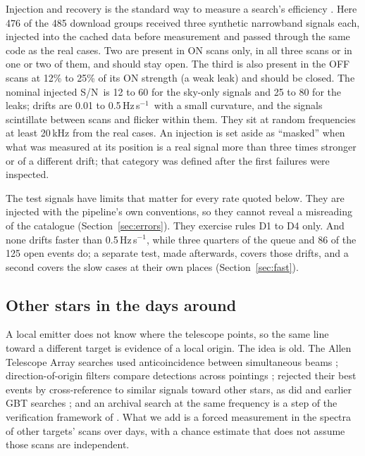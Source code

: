 \documentclass[twocolumn]{aastex631}
\newcommand{\hzs}{Hz\,s$^{-1}$}
\newcommand{\sn}{S/N}
\begin{document}
Injection and recovery is the standard way to measure a search's efficiency
\citep{Margot2021,Brzycki2022}. Here 476 of the 485 download groups
received three synthetic narrowband signals each, injected into the cached
data before measurement and passed through the same code as the real cases.
Two are present in ON scans only, in all three scans or in one or two of
them, and should stay open. The third is also present in the OFF scans at
12\% to 25\% of its ON strength (a weak leak) and should be closed. The
nominal injected \sn\ is 12 to 60 for the sky-only signals and 25 to 80 for
the leaks; drifts are 0.01 to 0.5\,\hzs\ with a small curvature, and the
signals scintillate between scans and flicker within them. They sit at
random frequencies at least 20\,kHz from the real cases. An injection is set
aside as ``masked'' when what was measured at its position is a real signal
more than three times stronger or of a different drift; that category was
defined after the first failures were inspected.

The test signals have limits that matter for every rate quoted below. They
are injected with the pipeline's own conventions, so they cannot reveal a
misreading of the catalogue (Section~\ref{sec:errors}). They exercise rules
D1 to D4 only. And none drifts faster than 0.5\,\hzs, while three quarters of
the queue and 86 of the 125 open events do; a separate test, made afterwards,
covers those drifts, and a second covers the slow cases at their own places (Section~\ref{sec:fast}).

\subsection{Other stars in the days around} \label{sec:probe}

A local emitter does not know where the telescope points, so the same line
toward a different target is evidence of a local origin. The idea is old.
The Allen Telescope Array searches used anticoincidence between
simultaneous beams \citep{Harp2016}; direction-of-origin filters compare
detections across pointings \citep{PinchukMargot2022,Margot2021};
\citet{Price2020} rejected their best events by cross-reference to similar
signals toward other stars, as did \citet{Painter2025} and earlier
GBT searches \citep{Siemion2013,Enriquez2017}; and an archival
search at the same frequency is a step of the verification framework of
\citet{Sheikh2021}. What we add is a forced measurement in the spectra of
other targets' scans over days, with a chance estimate that does not assume
those scans are independent.
\end{document}
